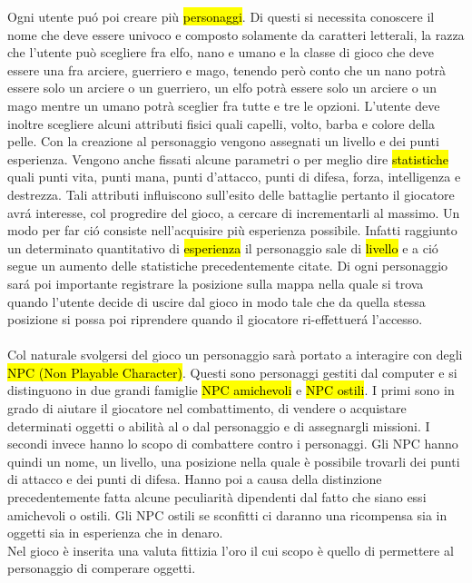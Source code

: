 Ogni utente pu\'{o} poi creare pi\`{u} \hl{personaggi}. Di questi si necessita conoscere il nome che deve essere univoco e composto solamente da caratteri letterali, la razza che l'utente pu\`{o} scegliere fra elfo, nano e umano e la classe di gioco che deve essere una fra arciere, guerriero e mago, tenendo per\`{o} conto  che un nano potr\`{a} essere solo un arciere o un guerriero, un elfo potr\`{a} essere solo un arciere o un mago mentre un umano potr\`{a} sceglier fra  tutte e tre le opzioni. L'utente deve inoltre scegliere alcuni attributi fisici quali capelli, volto, barba e colore della pelle. Con la creazione al personaggio vengono assegnati un livello e dei punti esperienza. Vengono anche  fissati  alcune parametri o per meglio dire  \hl{statistiche} quali punti vita, punti mana, punti d'attacco, punti di difesa, forza, intelligenza e destrezza. Tali attributi influiscono sull'esito delle battaglie pertanto il giocatore avr\'{a} interesse, col progredire del gioco, a cercare di incrementarli al massimo. Un modo per far ci\'{o} consiste nell'acquisire pi\`{u} esperienza possibile. Infatti raggiunto un determinato quantitativo di \hl{esperienza} il personaggio sale di \hl{livello} e a ci\'{o} segue un aumento delle statistiche precedentemente citate. 
Di ogni personaggio sar\'{a} poi importante registrare la posizione sulla mappa nella quale si trova quando l'utente decide di uscire dal gioco in modo tale che da quella stessa posizione si possa poi riprendere quando il giocatore ri-effettuer\'{a} l'accesso.
\\
\\
Col naturale svolgersi  del gioco un personaggio  sarà portato a interagire con degli \hl{NPC (Non Playable Character)}. Questi sono personaggi gestiti dal computer e si distinguono in due grandi famiglie \hl{NPC amichevoli} e \hl{NPC ostili}. I primi sono in grado di aiutare il giocatore nel combattimento, di vendere o acquistare determinati oggetti o abilità al o dal personaggio e di assegnargli missioni. I secondi invece hanno lo scopo di combattere contro i personaggi.
Gli NPC hanno quindi un nome, un livello, una posizione nella quale è possibile trovarli dei punti di attacco e dei punti di difesa. Hanno poi a causa della distinzione precedentemente fatta alcune peculiarità dipendenti dal fatto che  siano essi amichevoli o ostili. Gli NPC ostili se sconfitti ci daranno una ricompensa sia in oggetti sia in esperienza che in  denaro.\\

Nel gioco è inserita una valuta fittizia l'oro il cui scopo è quello di permettere al personaggio di comperare oggetti.\\

